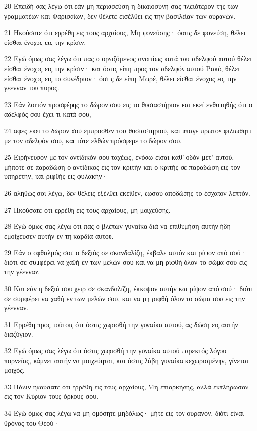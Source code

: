 \par 20 Επειδή σας λέγω ότι εάν μη περισσεύση η δικαιοσύνη σας πλειότερον της των γραμματέων και Φαρισαίων, δεν θέλετε εισέλθει εις την βασιλείαν των ουρανών.
\par 21 Ηκούσατε ότι ερρέθη εις τους αρχαίους, Μη φονεύσης· όστις δε φονεύση, θέλει είσθαι ένοχος εις την κρίσιν.
\par 22 Εγώ όμως σας λέγω ότι πας ο οργιζόμενος αναιτίως κατά του αδελφού αυτού θέλει είσθαι ένοχος εις την κρίσιν· και όστις είπη προς τον αδελφόν αυτού Ρακά, θέλει είσθαι ένοχος εις το συνέδριον· όστις δε είπη Μωρέ, θέλει είσθαι ένοχος εις την γέενναν του πυρός.
\par 23 Εάν λοιπόν προσφέρης το δώρον σου εις το θυσιαστήριον και εκεί ενθυμηθής ότι ο αδελφός σου έχει τι κατά σου,
\par 24 άφες εκεί το δώρον σου έμπροσθεν του θυσιαστηρίου, και ύπαγε πρώτον φιλιώθητι με τον αδελφόν σου, και τότε ελθών πρόσφερε το δώρον σου.
\par 25 Ειρήνευσον με τον αντίδικόν σου ταχέως, ενόσω είσαι καθ' οδόν μετ' αυτού, μήποτε σε παραδώση ο αντίδικος εις τον κριτήν και ο κριτής σε παραδώση εις τον υπηρέτην, και ριφθής εις φυλακήν·
\par 26 αληθώς σοι λέγω, δεν θέλεις εξέλθει εκείθεν, εωσού αποδώσης το έσχατον λεπτόν.
\par 27 Ηκούσατε ότι ερρέθη εις τους αρχαίους, μη μοιχεύσης.
\par 28 Εγώ όμως σας λέγω ότι πας ο βλέπων γυναίκα διά να επιθυμήση αυτήν ήδη εμοίχευσεν αυτήν εν τη καρδία αυτού.
\par 29 Εάν ο οφθαλμός σου ο δεξιός σε σκανδαλίζη, έκβαλε αυτόν και ρίψον από σού· διότι σε συμφέρει να χαθή εν των μελών σου και να μη ριφθή όλον το σώμα σου εις την γέενναν.
\par 30 Και εάν η δεξιά σου χειρ σε σκανδαλίζη, έκκοψον αυτήν και ρίψον από σού· διότι σε συμφέρει να χαθή εν των μελών σου, και να μη ριφθή όλον το σώμα σου εις την γέενναν.
\par 31 Ερρέθη προς τούτοις ότι όστις χωρισθή την γυναίκα αυτού, ας δώση εις αυτήν διαζύγιον.
\par 32 Εγώ όμως σας λέγω ότι όστις χωρισθή την γυναίκα αυτού παρεκτός λόγου πορνείας, κάμνει αυτήν να μοιχεύηται, και όστις λάβη γυναίκα κεχωρισμένην, γίνεται μοιχός.
\par 33 Πάλιν ηκούσατε ότι ερρέθη εις τους αρχαίους, Μη επιορκήσης, αλλά εκπλήρωσον εις τον Κύριον τους όρκους σου.
\par 34 Εγώ όμως σας λέγω να μη ομόσητε μηδόλως· μήτε εις τον ουρανόν, διότι είναι θρόνος του Θεού·
